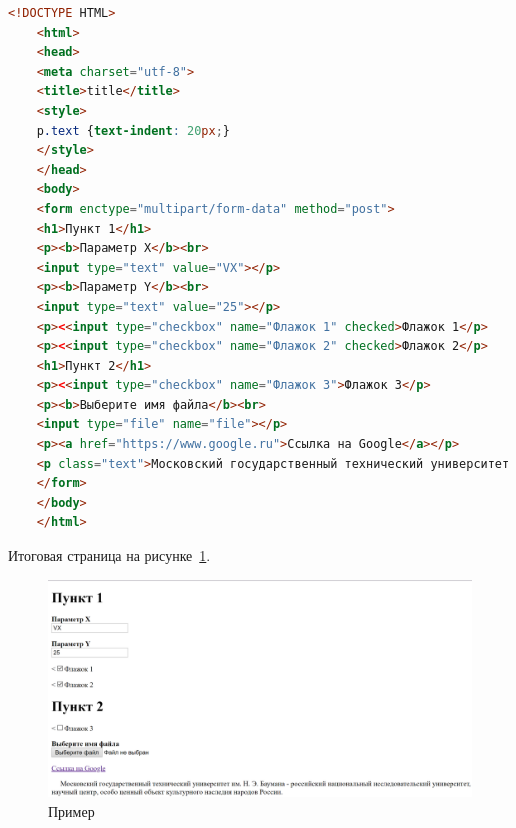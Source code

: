 \begin{lstlisting}[frame=single, label={rndhpcgui.2023.02.28.HTML}, caption={Пример выходных данных}, language={HTML}] 
	<!DOCTYPE HTML>
	<html>
	<head>
	<meta charset="utf-8">
	<title>title</title>
	<style>
	p.text {text-indent: 20px;}
	</style>
	</head>
	<body>
	<form enctype="multipart/form-data" method="post">
	<h1>Пункт 1</h1>
	<p><b>Параметр X</b><br>
	<input type="text" value="VX"></p>
	<p><b>Параметр Y</b><br>
	<input type="text" value="25"></p>
	<p><<input type="checkbox" name="Флажок 1" checked>Флажок 1</p>
	<p><<input type="checkbox" name="Флажок 2" checked>Флажок 2</p>
	<h1>Пункт 2</h1>
	<p><<input type="checkbox" name="Флажок 3">Флажок 3</p>
	<p><b>Выберите имя файла</b><br>
	<input type="file" name="file"></p>
	<p><a href="https://www.google.ru">Ссылка на Google</a></p>
	<p class="text">Московский государственный технический университет им. Н. Э. Баумана - российский национальный исследовательский университет, научный центр, особо ценный объект культурного наследия народов России.</p>
	</form>
	</body>
	</html>
\end{lstlisting}

Итоговая страница на рисунке~\ref{rndhpcgui.2023.02.28.picture1}.
\begin{figure}[!ht]
  \centering
  \includegraphics[scale=0.4]{ResearchNotes/rndhpc_dev_gui_2023_02_28/rndhpcgui.2023.02.28.picture1.png}
  \caption{Пример}
  \label{rndhpcgui.2023.02.28.picture1}
\end{figure}

